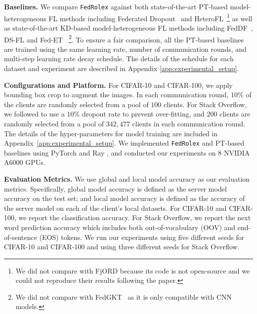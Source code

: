 \documentclass{article}
\begin{document}
\textbf{Baselines.}
We compare \texttt{FedRolex} against both state-of-the-art PT-based model-heterogeneous FL methods including Federated Dropout~\citep{caldas2018expanding} and HeteroFL~\citep{diao2020heterofl}\footnote{We did not compare with FjORD because its code is not open-source and we could not reproduce their results following the paper.} as well as state-of-the-art KD-based model-heterogeneous FL methods including FedDF~\citep{lin2020ensemble}, DS-FL \cite{itahara2020distillation} and Fed-ET~\citep{cho2022heterogeneous} \footnote{We did not compare with FedGKT~\cite{he2020group} as it is only compatible with CNN models.}.
To ensure a fair comparison, all the PT-based baselines are trained using the same learning rate, number of communication rounds, and  multi-step learning rate decay schedule. The details of the schedule for each dataset and experiment are described in Appendix \ref{app:experimental_setup}.


\textbf{Configurations and Platform.}
For CIFAR-10 and CIFAR-100, we apply bounding box crop \citep{zoph2020learning} to augment the images. In each communication round, $10\%$ of the clients are randomly selected from a pool of $100$ clients. 
%
For Stack Overflow, we followed \cite{wang2021field} to use a $10\%$ dropout rate to prevent over-fitting, and $200$ clients are randomly selected from a pool of $342,477$ clients in each communication round. The details of the hyper-parameters for model training are included in Appendix~\ref{app:experimental_setup}. We implemented \texttt{FedRolex} and PT-based baselines using PyTorch \cite{paszke2015pytorch} and Ray \cite{moritz2018ray}, and conducted our experiments on $8$ NVIDIA A$6000$ GPUs.

\textbf{Evaluation Metrics.}
%
We use global and local model accuracy as our evaluation metrics. Specifically, global model accuracy is defined as the server model accuracy on the test set; and local model accuracy is defined as the accuracy of the server model on each of the client's local datasets. 
%
For CIFAR-10 and CIFAR-100, we report the classification accuracy. For Stack Overflow, we report the next word prediction accuracy which includes both out-of-vocabulary (OOV) and end-of-sentence (EOS) tokens. 
We run our experiments using five different seeds for CIFAR-10 and CIFAR-100 and using three different seeds for Stack Overflow.
\end{document}
